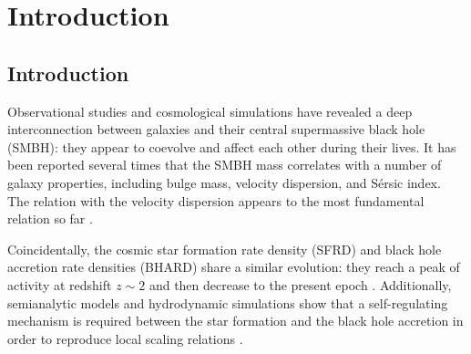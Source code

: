 \chapter{Introduction}



\section{Introduction}
Observational studies and cosmological simulations have revealed a deep interconnection between galaxies and their central supermassive black hole (SMBH): they appear to coevolve and affect each other during their lives.
It has been reported several times that the SMBH mass correlates with a number of galaxy properties, including bulge mass, velocity dispersion, and S\'{e}rsic index. The relation with the velocity dispersion appears to the most fundamental relation so far \citep[e.g.,][]{2007ApJ...660..267B, 2016MNRAS.460.3119S, 2017MNRAS.466.4029S,2019MNRAS.485.1278S}.

Coincidentally, the cosmic star formation rate density (SFRD) and black hole accretion rate densities (BHARD) share a similar evolution: they reach a peak of activity at redshift $z\sim2$ and then decrease to the present epoch \citep{1998MNRAS.293L..49B, 2014MNRAS.439.2736D, 2014ARA&A..52..415M}. Additionally, semianalytic models and hydrodynamic simulations show that a self-regulating mechanism is required between the star formation and the black hole accretion in order to reproduce local scaling relations \citep[see][for a review]{2015ARA&A..53...51S}.
        
